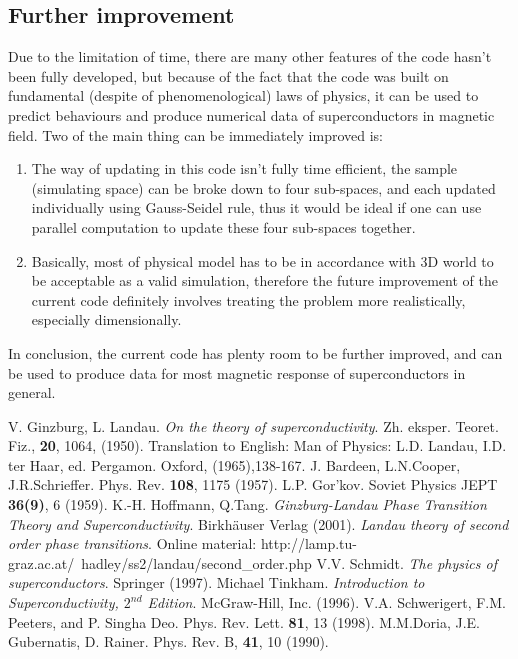 \documentclass[11pt]{article}
\newcommand{\bn}{\begin{enumerate}}
\newcommand{\en}{\end{enumerate}}
\begin{document}
\subsection{Further improvement}
Due to the limitation of time, there are many other features of the code hasn't been fully developed, but because of the fact that the code was built on fundamental (despite of phenomenological) laws of physics, it can be used to predict behaviours and produce numerical data of superconductors in magnetic field. Two of the main thing can be immediately improved is:\\
\bn
\item The way of updating in this code isn't fully time efficient, the sample (simulating space) can be broke down to four sub-spaces, and each updated individually using Gauss-Seidel rule, thus it would be ideal if one can use parallel computation to update these four sub-spaces together.
\item Basically, most of physical model has to be in accordance with 3D world to be acceptable as a valid simulation, therefore the future improvement of the current code definitely involves treating the problem more realistically, especially dimensionally. 
\en
\par
In conclusion, the current code has plenty room to be further improved, and can be used to produce data for most magnetic response of superconductors in general.\\ 

\newpage
\begin{thebibliography}{9}
V. Ginzburg, L. Landau. \emph{On the theory of superconductivity}. Zh. eksper. Teoret. Fiz., {\bf 20}, 1064, (1950). Translation to English: Man of Physics: L.D. Landau, I.D. ter Haar, ed. Pergamon. Oxford, (1965),138-167.
J. Bardeen, L.N.Cooper, J.R.Schrieffer. Phys. Rev. {\bf108}, 1175 (1957).
L.P. Gor'kov. Soviet Physics JEPT {\bf36(9)}, 6 (1959).
K.-H. Hoffmann, Q.Tang. \emph{Ginzburg-Landau Phase Transition Theory and Superconductivity}. Birkh\"{a}user Verlag (2001).
\emph{Landau theory of second order phase transitions}. Online material: http://lamp.tu-graz.ac.at/~hadley/ss2/landau/second\_order.php
V.V. Schmidt. \emph{The physics of superconductors}. Springer (1997).
Michael Tinkham. \emph{Introduction to Superconductivity, $2^{nd}$ Edition}. McGraw-Hill, Inc. (1996).
V.A. Schwerigert, F.M. Peeters, and P. Singha Deo. Phys. Rev. Lett. {\bf 81}, 13 (1998).
M.M.Doria, J.E. Gubernatis, D. Rainer. Phys. Rev. B, {\bf41}, 10 (1990).
\end{thebibliography}
\end{document}
